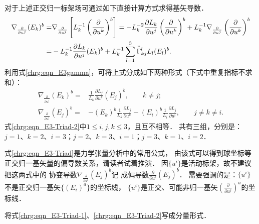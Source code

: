 对于上述正交归一标架场可通过如下直接计算方式求得基矢导数．
\begin{align*}
    \nabla_{\frac{\partial }{\partial u^j}} (E_k)^b = & \nabla_{\frac{\partial }{\partial u^j}}
    \left[ L_{k}^{-1} \left(\frac{\partial}{\partial u^k}\right)^b \right]
    =-L_{k}^{-2} \frac{\partial L_{k}}{\partial u^j}\left(\frac{\partial}{\partial u^k}\right)^b
    +L_{k}^{-1} \nabla_{\frac{\partial }{\partial u^j}} \left(\frac{\partial}{\partial u^k}\right)^b \\
    =&-L_{k}^{-1} \frac{\partial L_{k}}{\partial u^j} (E_k)^b
    +L_{k}^{-1}  \sum_{l=1}^{3} \oversetmy{u}{\Gamma}^l_{kj} L_{l} (E_l)^b  .
\end{align*}
利用式\eqref{chrg:eqn_E3gamma}，可将上式分成如下两种形式（下式中重复指标不求和）：
\begin{subequations}\label{chrg:eqn_E3-Triad}
    \begin{align}    
        \nabla_{\frac{\partial }{\partial u^j}} (E_k)^b  = &
        \frac{1}{L_k} \frac{\partial L_j}{\partial u^k} (E_j)^b  ,
        \qquad k\neq j ; \label{chrg:eqn_E3-Triad-1}\\
        \nabla _{\frac{\partial }{\partial u^j}} (E_j)^b =& 
        - (E_k)^b \frac{1}{L_k} \frac{\partial L_j}{\partial u^k} 
        - (E_i)^b \frac{1}{L_i} \frac{\partial L_j}{\partial u^i},
        \qquad j\neq k \neq i . \label{chrg:eqn_E3-Triad-2}
    \end{align}    
\end{subequations}
式\eqref{chrg:eqn_E3-Triad-2}中$1\leqslant i,j,k \leqslant 3$，且互不相等．
共有三组，分别是：$j=1$、$k=2$、$i=3$；$j=2$、$k=3$、$i=1$；$j=3$、$k=1$、$i=2$．


式\eqref{chrg:eqn_E3-Triad}是力学张量分析中的常用公式，
由该式可以得到球坐标等正交归一基矢量的偏导数关系，请读者试着推演．
因$\{u^i\}$是活动标架，故不建议把这两式中的
协变导数$\nabla _{\frac{\partial }{\partial u^i}} (E_j)^b$记
成偏导数$\frac{\partial }{\partial u^i} (E_j)^b$．
需要强调的是：$\{u^i\}$不是正交归一基矢$\{(E_i)^a\}$的坐标线，
$\{u^i\}$是正交、可能非归一基矢$(\frac{\partial }{\partial u^j})^a$的坐标线．




\begin{exercise}
	将式\eqref{chrg:eqn_E3-Triad-1}、\eqref{chrg:eqn_E3-Triad-2}写成分量形式．
\end{exercise}


